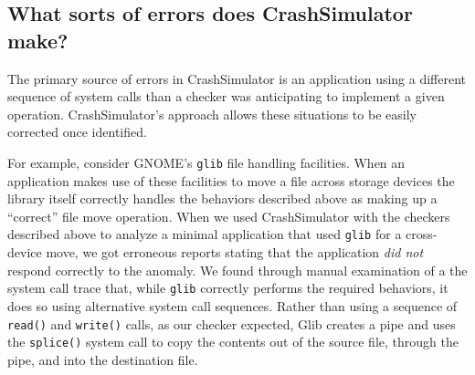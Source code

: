         
\subsection{What sorts of errors does CrashSimulator make?}
\label{sec-sorts-errors}
%
The primary source of %
errors in CrashSimulator is an
application using a different sequence of system calls than a checker was
anticipating to implement a given operation.  CrashSimulator's
approach allows these situations to be easily corrected once identified.


For example, consider GNOME's {\tt glib} file handling facilities.  When an
application makes use of these facilities to move a file across storage devices
the library itself correctly handles the behaviors described above as
making up a ``correct'' file move operation.  When we used CrashSimulator 
with the checkers described above to
analyze a minimal application that used {\tt glib} for a cross-device move,
we got erroneous reports stating that the application {\em did not} respond
correctly to the anomaly.
We found through manual examination of a
the system call trace that, while {\tt glib} correctly performs
the required behaviors, it does so using alternative system call sequences. 
Rather than using a sequence of
{\tt read()} and {\tt write()} calls, 
as our checker expected,
Glib creates a pipe and uses the
{\tt splice()} system call to copy the contents out of the source file, through
the pipe, and into the destination file.

